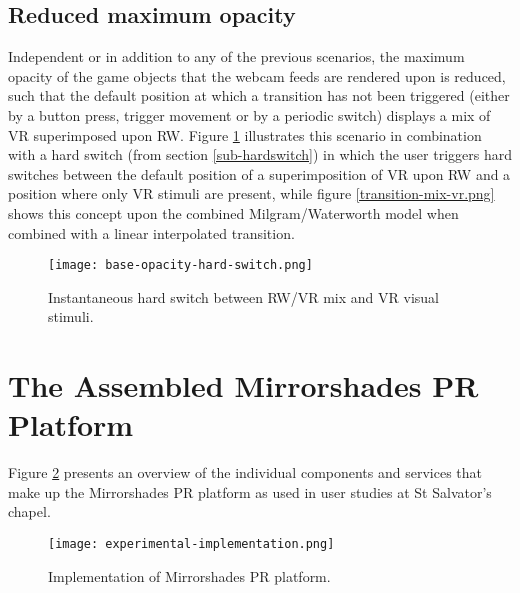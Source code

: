 \subsection{Reduced maximum opacity}
\label{subsub-baseopacity}
Independent or in addition to any of the previous scenarios, the maximum opacity of the game objects that the webcam feeds are rendered upon is reduced, such that the default position at which a transition has not been triggered (either by a button press, trigger movement or by a periodic switch) displays a mix of VR superimposed upon RW. Figure \ref{scenariobaseopacity} illustrates this scenario in combination with a hard switch (from section \ref{sub-hardswitch}) in which the user triggers hard switches between the default position of a superimposition of VR upon RW and a position where only VR stimuli are present, while figure \ref{transition-mix-vr.png} shows this concept upon the combined Milgram/Waterworth model when combined with a linear interpolated transition.

\begin{figure}[h]
	\begin{center}
		\texttt{[image: base-opacity-hard-switch.png]}
		\caption{Instantaneous hard switch between RW/VR mix and VR visual stimuli.}
		\label{scenariobaseopacity}
	\end{center}
\end{figure}


\section{The Assembled Mirrorshades PR Platform}

Figure \ref{experimentalimplementation} presents an overview of the individual components and services that make up the Mirrorshades PR platform as used in user studies at St Salvator's chapel.

\begin{figure}[h]
	\thispagestyle{empty}
	\begin{center}
		\texttt{[image: experimental-implementation.png]}
		\caption{Implementation of Mirrorshades PR platform.}
		\label{experimentalimplementation}
	\end{center}
\end{figure}

